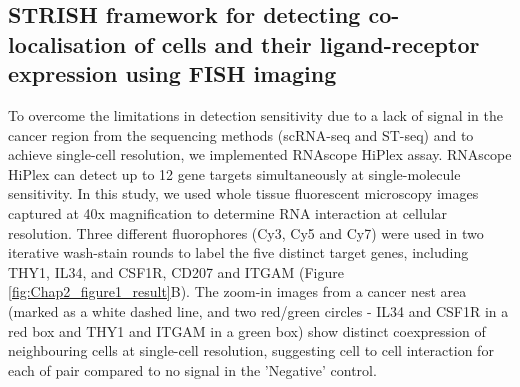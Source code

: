 \subsection{STRISH framework for detecting co-localisation of cells and their ligand-receptor expression using FISH imaging}
\label{Sec:2.2_STRISH}	%

To overcome the limitations in detection sensitivity due to a lack of signal in the cancer region from the sequencing methods (scRNA-seq and ST-seq) and to achieve single-cell resolution, we implemented RNAscope HiPlex assay. RNAscope HiPlex can detect up to 12 gene targets simultaneously at single-molecule sensitivity. In this study, we used whole tissue fluorescent microscopy images captured at 40x magnification to determine RNA interaction at cellular resolution. Three different fluorophores (Cy3, Cy5 and Cy7) were used in two iterative wash-stain rounds to label the five distinct target genes, including THY1, IL34, and CSF1R, CD207 and ITGAM (Figure \ref{fig:Chap2_figure1_result}B). The zoom-in images from a cancer nest area (marked as a white dashed line, and two red/green circles - IL34 and CSF1R in a red box and THY1 and ITGAM in a green box) show distinct coexpression of neighbouring cells at single-cell resolution, suggesting cell to cell interaction for each of pair compared to no signal in the 'Negative' control. 
